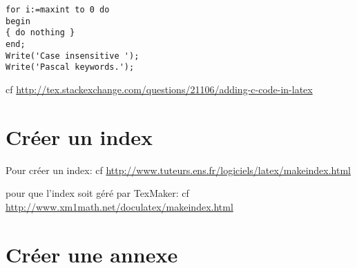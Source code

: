 \begin{lstlisting}
for i:=maxint to 0 do
begin
{ do nothing }
end;
Write('Case insensitive ');
Write('Pascal keywords.');
\end{lstlisting}


cf \url{http://tex.stackexchange.com/questions/21106/adding-c-code-in-latex}


\section{Cr\'eer un index}
Pour cr\'eer un index:
cf \url{http://www.tuteurs.ens.fr/logiciels/latex/makeindex.html}

pour que l'index soit g\'er\'e par TexMaker:
cf \url{http://www.xm1math.net/doculatex/makeindex.html}




\section{Cr\'eer une annexe}

